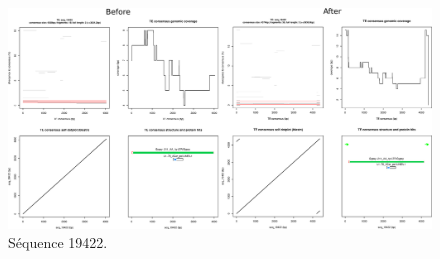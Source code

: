 \documentclass[10pt]{article}
\begin{document}
\begin{figure}[H]
    \centering
    \includegraphics[width=\textwidth]{img/plots/seq_19422.eps}
    \caption{Séquence 19422.}
    \label{fig:seq_19422}
\end{figure}

\bigskip
\end{document}
